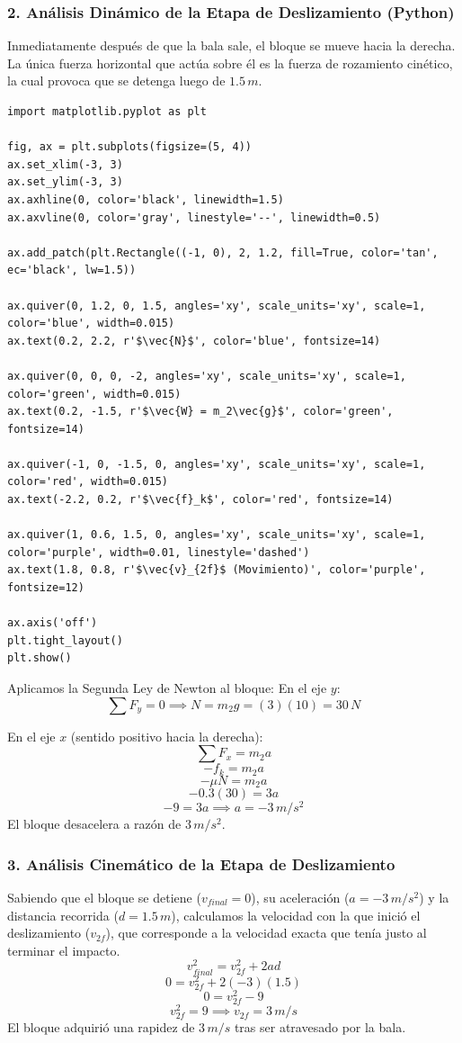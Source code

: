 \documentclass[12pt, a4paper]{article}
\begin{document}
\subsubsection*{2. Análisis Dinámico de la Etapa de Deslizamiento (Python)}
Inmediatamente después de que la bala sale, el bloque se mueve hacia la derecha. La única fuerza horizontal que actúa sobre él es la fuerza de rozamiento cinético, la cual provoca que se detenga luego de $1.5 \, \si{m}$.

\begin{lstlisting}
import matplotlib.pyplot as plt

fig, ax = plt.subplots(figsize=(5, 4))
ax.set_xlim(-3, 3)
ax.set_ylim(-3, 3)
ax.axhline(0, color='black', linewidth=1.5)
ax.axvline(0, color='gray', linestyle='--', linewidth=0.5)

ax.add_patch(plt.Rectangle((-1, 0), 2, 1.2, fill=True, color='tan', ec='black', lw=1.5))

ax.quiver(0, 1.2, 0, 1.5, angles='xy', scale_units='xy', scale=1, color='blue', width=0.015)
ax.text(0.2, 2.2, r'$\vec{N}$', color='blue', fontsize=14)

ax.quiver(0, 0, 0, -2, angles='xy', scale_units='xy', scale=1, color='green', width=0.015)
ax.text(0.2, -1.5, r'$\vec{W} = m_2\vec{g}$', color='green', fontsize=14)

ax.quiver(-1, 0, -1.5, 0, angles='xy', scale_units='xy', scale=1, color='red', width=0.015)
ax.text(-2.2, 0.2, r'$\vec{f}_k$', color='red', fontsize=14)

ax.quiver(1, 0.6, 1.5, 0, angles='xy', scale_units='xy', scale=1, color='purple', width=0.01, linestyle='dashed')
ax.text(1.8, 0.8, r'$\vec{v}_{2f}$ (Movimiento)', color='purple', fontsize=12)

ax.axis('off')
plt.tight_layout()
plt.show()
\end{lstlisting}

Aplicamos la Segunda Ley de Newton al bloque:
En el eje $y$:
\[ \sum F_y = 0 \implies N = m_2 g = (3)(10) = 30 \, \si{N} \]

En el eje $x$ (sentido positivo hacia la derecha):
\[ \sum F_x = m_2 a \]
\[ -f_k = m_2 a \]
\[ -\mu N = m_2 a \]
\[ -0.3 (30) = 3 a \]
\[ -9 = 3 a \implies a = -3 \, \si{m/s^2} \]
El bloque desacelera a razón de $3 \, \si{m/s^2}$.

\subsubsection*{3. Análisis Cinemático de la Etapa de Deslizamiento}
Sabiendo que el bloque se detiene ($v_{final} = 0$), su aceleración ($a = -3 \, \si{m/s^2}$) y la distancia recorrida ($d = 1.5 \, \si{m}$), calculamos la velocidad con la que inició el deslizamiento ($v_{2f}$), que corresponde a la velocidad exacta que tenía justo al terminar el impacto.
\[ v_{final}^2 = v_{2f}^2 + 2ad \]
\[ 0 = v_{2f}^2 + 2(-3)(1.5) \]
\[ 0 = v_{2f}^2 - 9 \]
\[ v_{2f}^2 = 9 \implies v_{2f} = 3 \, \si{m/s} \]
El bloque adquirió una rapidez de $3 \, \si{m/s}$ tras ser atravesado por la bala.
\end{document}
